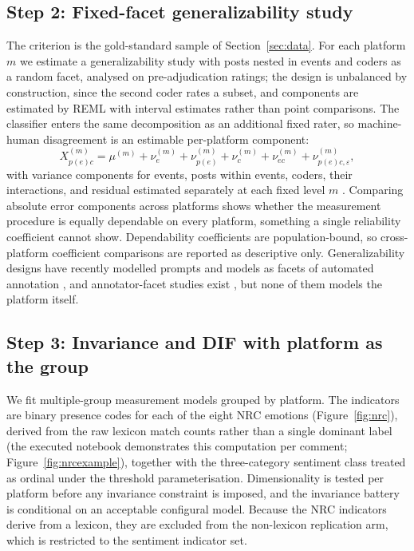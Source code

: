 \subsection{Step 2: Fixed-facet generalizability study}
The criterion is the gold-standard sample of Section~\ref{sec:data}. For each platform $m$ we estimate a generalizability study with posts nested in events and coders as a random facet, analysed on pre-adjudication ratings; the design is unbalanced by construction, since the second coder rates a subset, and components are estimated by REML with interval estimates rather than point comparisons. The classifier enters the same decomposition as an additional fixed rater, so machine-human disagreement is an estimable per-platform component:
\begin{equation}
X^{(m)}_{p(e)c} = \mu^{(m)} + \nu^{(m)}_{e} + \nu^{(m)}_{p(e)} + \nu^{(m)}_{c} + \nu^{(m)}_{ec} + \nu^{(m)}_{p(e)c,\varepsilon},
\label{eq:gstudy}
\end{equation}
with variance components for events, posts within events, coders, their interactions, and residual estimated separately at each fixed level $m$ \citep{cronbach1972, brennan2001}. Comparing absolute error components across platforms shows whether the measurement procedure is equally dependable on every platform, something a single reliability coefficient cannot show. Dependability coefficients are population-bound, so cross-platform coefficient comparisons are reported as descriptive only. Generalizability designs have recently modelled prompts and models as facets of automated annotation \citep{camuffo2026}, and annotator-facet studies exist \citep{kennedy2020, sachdeva2022}, but none of them models the platform itself.

\subsection{Step 3: Invariance and DIF with platform as the group}
We fit multiple-group measurement models grouped by platform. The indicators are binary presence codes for each of the eight NRC emotions (Figure~\ref{fig:nrc}), derived from the raw lexicon match counts rather than a single dominant label (the executed notebook demonstrates this computation per comment; Figure~\ref{fig:nrcexample}), together with the three-category sentiment class treated as ordinal under the threshold parameterisation. Dimensionality is tested per platform before any invariance constraint is imposed, and the invariance battery is conditional on an acceptable configural model. Because the NRC indicators derive from a lexicon, they are excluded from the non-lexicon replication arm, which is restricted to the sentiment indicator set.

